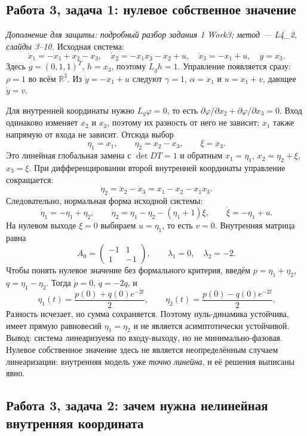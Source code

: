 \subsection{Работа 3, задача 1: нулевое собственное значение}

\textit{Дополнение для защиты: подробный разбор задания 1 Work3;
метод --- L4\_2, слайды 3--10.}
Исходная система:
\[
 \dot x_1=-x_1+x_2-x_3,\quad
 \dot x_2=-x_1x_3-x_2+u,\quad
 \dot x_3=-x_1+u,\quad y=x_3.
\]
Здесь $g=(0,1,1)^T$, $h=x_3$, поэтому $L_gh=1$.
Управление появляется сразу: $\rho=1$ во всём $\mathbb R^3$.
Из $\dot y=-x_1+u$ следуют
$\gamma=1$, $\alpha=x_1$ и $u=x_1+v$, дающее $\dot y=v$.

Для внутренней координаты нужно $L_g\varphi=0$, то есть
$\partial\varphi/\partial x_2+\partial\varphi/\partial x_3=0$.
Вход одинаково изменяет $x_2$ и $x_3$, поэтому их разность от него
не зависит; $x_1$ также напрямую от входа не зависит. Отсюда выбор
\[
 \eta_1=x_1,\qquad\eta_2=x_2-x_3,\qquad\xi=x_3.
\]
Это линейная глобальная замена с $\det DT=1$ и обратным
$x_1=\eta_1$, $x_2=\eta_2+\xi$, $x_3=\xi$.
При дифференцировании второй внутренней координаты управление
сокращается:
\[
 \dot\eta_2=\dot x_2-\dot x_3=x_1-x_2-x_1x_3.
\]
Следовательно, нормальная форма исходной системы:
\[
 \dot\eta_1=-\eta_1+\eta_2,\qquad
 \dot\eta_2=\eta_1-\eta_2-(\eta_1+1)\xi,\qquad
 \dot\xi=-\eta_1+u.
\]
На нулевом выходе $\xi=0$ выбираем $u=\eta_1$, то есть $v=0$.
Внутренняя матрица равна
\[
 A_0=\begin{pmatrix}-1&1\\1&-1\end{pmatrix},\qquad
 \lambda_1=0,\quad\lambda_2=-2.
\]
Чтобы понять нулевое значение без формального критерия, введём
$p=\eta_1+\eta_2$, $q=\eta_1-\eta_2$. Тогда $\dot p=0$,
$\dot q=-2q$, и
\[
 \eta_1(t)=\frac{p(0)+q(0)e^{-2t}}{2},\qquad
 \eta_2(t)=\frac{p(0)-q(0)e^{-2t}}{2}.
\]
Разность исчезает, но сумма сохраняется. Поэтому нуль-динамика
устойчива, имеет прямую равновесий $\eta_1=\eta_2$ и не является
асимптотически устойчивой. Вывод: система линеаризуема по входу-выходу,
но не минимально-фазовая. Нулевое собственное значение здесь не
является неопределённым случаем линеаризации: внутренняя модель уже
\emph{точно линейна}, и её решения выписаны явно.

\subsection{Работа 3, задача 2: зачем нужна нелинейная внутренняя координата}

